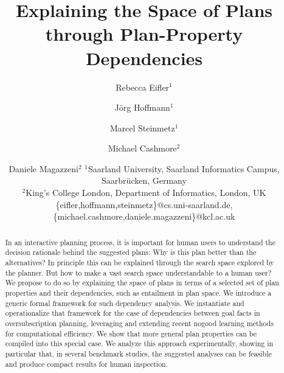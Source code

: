 \documentclass{article}
\begin{document}
\title{Explaining the Space of Plans through Plan-Property Dependencies}

\author{
Rebecca Eifler$^1$\and
J\"org Hoffmann$^1$\and
Marcel Steinmetz$^1$\and
Michael Cashmore$^2$\and
Daniele Magazzeni$^2$
\affiliations
$^1$Saarland University, Saarland Informatics Campus, Saarbr\"ucken, Germany\\
$^2$King's College London, Department of Informatics, London, UK\\
\emails
\{eifler,hoffmann,steinmetz\}@cs.uni-saarland.de,
\{michael.cashmore,daniele.magazzeni\}@kcl.ac.uk 
}
%

\maketitle

\begin{abstract}
In an interactive planning process, it is important for human users to
understand the decision rationale behind the suggested plans: Why is
this plan better than the alternatives?  In principle this can be
explained through the search space explored by the planner.  But how
to make a vast search space understandable to a human user?  We
propose to do so by explaining the space of plans in terms of a
selected set of plan properties and their dependencies, such as
entailment in plan space.  We introduce a generic formal framework for
such dependency analysis.  We instantiate and operationalize that
framework for the case of dependencies between goal facts in
oversubscription planning, leveraging and extending recent nogood
learning methods for computational efficiency. We show that more
general plan properties can be compiled into this special case. We
analyze this approach experimentally, showing in particular that, in
several benchmark studies, the suggested analyses can be feasible and
produce compact results for human inspection.
\end{abstract}
\end{document}
